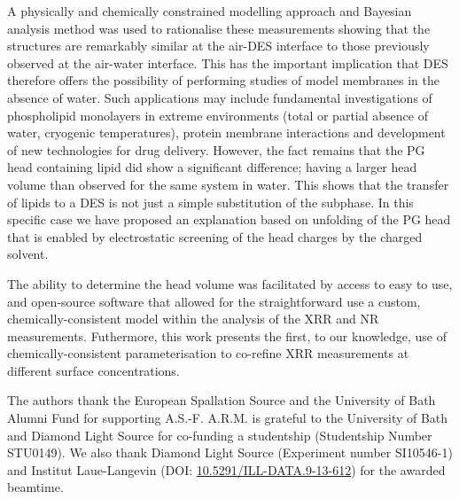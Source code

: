 \documentclass[%
 reprint,
 amsmath,amssymb,
 prl,
]{revtex4-1}
\begin{document}
A physically and chemically constrained modelling approach and Bayesian analysis method was used to rationalise these measurements showing that the structures are remarkably similar at the air-DES interface to those previously observed at the air-water interface.
This has the important implication that DES therefore offers the possibility of performing studies of model membranes in the absence of water.
Such applications may include fundamental investigations of phospholipid monolayers in extreme environments (total or partial absence of water, cryogenic temperatures), protein membrane interactions and development of new technologies for drug delivery.
However, the fact remains that the PG head containing lipid did show a significant difference; having a larger head volume than observed for the same system in water.
This shows that the transfer of lipids to a DES is not just a simple substitution of the subphase. In this specific case we have proposed an explanation based on unfolding of the PG head that is enabled by electrostatic screening of the head charges by the charged solvent.

The ability to determine the head volume was facilitated by access to easy to use, and open-source software that allowed for the straightforward use a custom, chemically-consistent model within the analysis of the XRR and NR measurements.
Futhermore, this work presents the first, to our knowledge, use of chemically-consistent parameterisation to co-refine XRR measurements at different surface concentrations.

\begin{acknowledgments}
The authors thank the European Spallation Source and the University of Bath Alumni Fund for supporting A.S.-F. A.R.M. is grateful to the University of Bath and Diamond Light Source for co-funding a studentship (Studentship Number STU0149). We also thank Diamond Light Source (Experiment number SI10546-1) and Institut Laue-Langevin (DOI: \href{http://doi.org/10.5291/ILL-DATA.9-13-612}{10.5291/ILL-DATA.9-13-612}) for the awarded beamtime.
\end{acknowledgments}

\end{document}
